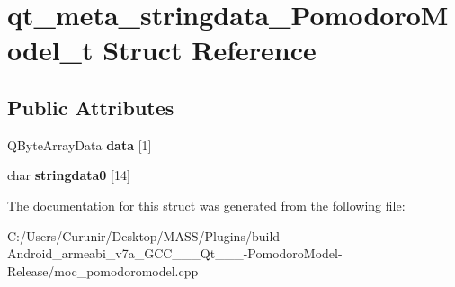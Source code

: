 \hypertarget{structqt__meta__stringdata___pomodoro_model__t}{}\section{qt\+\_\+meta\+\_\+stringdata\+\_\+\+Pomodoro\+Model\+\_\+t Struct Reference}
\label{structqt__meta__stringdata___pomodoro_model__t}
\subsection*{Public Attributes}
\begin{DoxyCompactItemize}
\item 
\mbox{\label{structqt__meta__stringdata___pomodoro_model__t_aa49d46235c02c881086d48be622c90d5}} 
Q\+Byte\+Array\+Data {\bfseries data} \mbox{[}1\mbox{]}
\item 
\mbox{\label{structqt__meta__stringdata___pomodoro_model__t_a34d2c9f7a75a666ef4cab3d05f4702f4}} 
char {\bfseries stringdata0} \mbox{[}14\mbox{]}
\end{DoxyCompactItemize}


The documentation for this struct was generated from the following file\+:\begin{DoxyCompactItemize}
\item 
C\+:/\+Users/\+Curunir/\+Desktop/\+M\+A\+S\+S/\+Plugins/build-\/\+Android\+\_\+armeabi\+\_\+v7a\+\_\+\+G\+C\+C\+\_\+\_\+\_\+\+Qt\+\_\+\_\+\_-\/\+Pomodoro\+Model-\/\+Release/moc\+\_\+pomodoromodel.\+cpp\end{DoxyCompactItemize}
